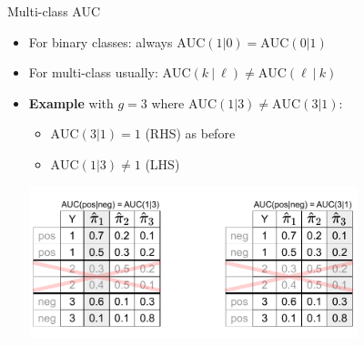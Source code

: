 \begin{vbframe}{Multi-class AUC}

\begin{itemize}
\item For binary classes: always $\text{AUC}(1 | 0) = \text{AUC}(0 | 1)$

\item For multi-class usually:
$\text{AUC}(k ~|~ \ell) \neq \text{AUC}(\ell ~|~ k)$

\item
\textbf{Example} with $g=3$ where $\text{AUC}(1|3) \neq \text{AUC}(3|1) $:
\begin{itemize}
\item $\text{AUC}(3|1) = 1$ (RHS) as before 
\item $\text{AUC}(1|3) \neq 1$ (LHS) 
\end{itemize}

\centerline{\includegraphics[trim = 0 15 00 10, clip, width=0.75\textwidth]{figure_man/multiclass-auc.pdf}}

\end{itemize}


\end{vbframe}


